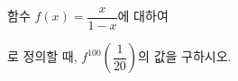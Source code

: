 \hspace*{2mm}\begin{minipage}[t]{\dimexpr\linewidth-2mm\relax}\vspace{0pt}
함수 $f(x)=\dfrac{x}{1-x}$에 대하여 \par\smallskip{}\par\smallskip\noindent 로 정의할 때, $f^{100}\!\left(\dfrac{1}{20}\right)$의 값을 구하시오.\end{minipage}
